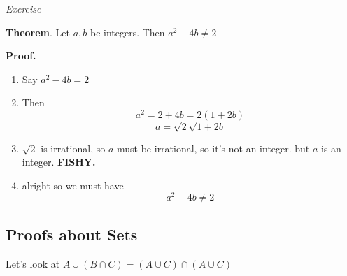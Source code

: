 \documentclass{article}
\begin{document}
\noindent\textit{Exercise}

\textbf{Theorem}. Let $a, b$ be integers. Then $a^2 - 4b \neq 2$

\textbf{Proof.}
\begin{enumerate}
\item Say $a^2 - 4b = 2$
\item Then $$a^2 = 2 + 4b = 2(1+2b)$$ $$a = \sqrt{2}\sqrt{1+2b}$$
\item $\sqrt{2}$ is irrational, so $a$ must be irrational, so it's not an integer. but $a$ is an integer. \LARGE\textbf{FISHY.}\normalsize
\item alright so we must have $$a^2 -4b \neq 2$$
\end{enumerate}

\subsection*{Proofs about Sets}

Let's look at $A \cup (B \cap C) = (A \cup C) \cap (A \cup C)$

\smallskip

\def\firstcircle{(90:.6cm) circle (1.cm)}
\def\secondcircle{(210:.6cm) circle (1.cm)}
\def\thirdcircle{(330:.6cm) circle (1.cm)}
\end{document}
